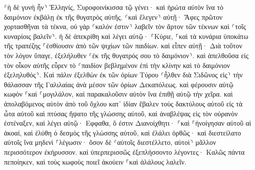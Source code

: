 \documentclass[twoside, 9pt]{extreport}
\begin{document}
⸂ἡ δὲ γυνὴ ἦν⸃ Ἑλληνίς, Συροφοινίκισσα τῷ γένει· καὶ ἠρώτα αὐτὸν ἵνα τὸ δαιμόνιον ἐκβάλῃ ἐκ τῆς θυγατρὸς αὐτῆς. 
⸂καὶ ἔλεγεν⸃ αὐτῇ· Ἄφες πρῶτον χορτασθῆναι τὰ τέκνα, οὐ γάρ ⸂καλόν ἐστιν⸃ λαβεῖν τὸν ἄρτον τῶν τέκνων καὶ ⸂τοῖς κυναρίοις βαλεῖν⸃. 
ἡ δὲ ἀπεκρίθη καὶ λέγει αὐτῷ· ⸀Κύριε, ⸀καὶ τὰ κυνάρια ὑποκάτω τῆς τραπέζης ⸀ἐσθίουσιν ἀπὸ τῶν ψιχίων τῶν παιδίων. 
καὶ εἶπεν αὐτῇ· Διὰ τοῦτον τὸν λόγον ὕπαγε, ἐξελήλυθεν ⸂ἐκ τῆς θυγατρός σου τὸ δαιμόνιον⸃. 
καὶ ἀπελθοῦσα εἰς τὸν οἶκον αὐτῆς εὗρεν τὸ ⸂παιδίον βεβλημένον ἐπὶ τὴν κλίνην καὶ τὸ δαιμόνιον ἐξεληλυθός⸃. 
Καὶ πάλιν ἐξελθὼν ἐκ τῶν ὁρίων Τύρου ⸂ἦλθεν διὰ Σιδῶνος εἰς⸃ τὴν θάλασσαν τῆς Γαλιλαίας ἀνὰ μέσον τῶν ὁρίων Δεκαπόλεως. 
καὶ φέρουσιν αὐτῷ κωφὸν ⸀καὶ ⸀μογιλάλον, καὶ παρακαλοῦσιν αὐτὸν ἵνα ἐπιθῇ αὐτῷ τὴν χεῖρα. 
καὶ ἀπολαβόμενος αὐτὸν ἀπὸ τοῦ ὄχλου κατ᾽ ἰδίαν ἔβαλεν τοὺς δακτύλους αὐτοῦ εἰς τὰ ὦτα αὐτοῦ καὶ πτύσας ἥψατο τῆς γλώσσης αὐτοῦ, 
καὶ ἀναβλέψας εἰς τὸν οὐρανὸν ἐστέναξεν, καὶ λέγει αὐτῷ· Εφφαθα, ὅ ἐστιν Διανοίχθητι· 
⸀καὶ ⸀ἠνοίγησαν αὐτοῦ αἱ ἀκοαί, καὶ ἐλύθη ὁ δεσμὸς τῆς γλώσσης αὐτοῦ, καὶ ἐλάλει ὀρθῶς· 
καὶ διεστείλατο αὐτοῖς ἵνα μηδενὶ ⸀λέγωσιν· ὅσον δὲ ⸂αὐτοῖς διεστέλλετο, αὐτοὶ⸃ μᾶλλον περισσότερον ἐκήρυσσον. 
καὶ ὑπερπερισσῶς ἐξεπλήσσοντο λέγοντες· Καλῶς πάντα πεποίηκεν, καὶ τοὺς κωφοὺς ποιεῖ ἀκούειν ⸀καὶ ἀλάλους λαλεῖν. 
\end{document}
